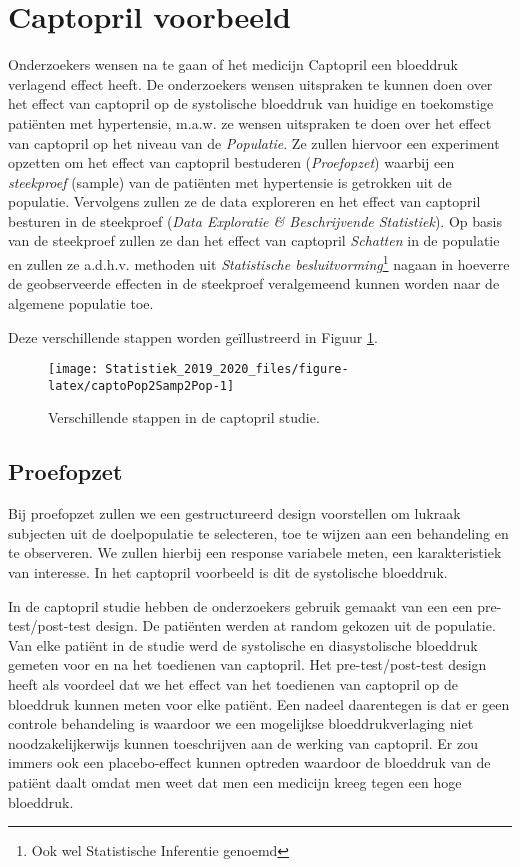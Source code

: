 \documentclass[12pt,dutch,coursenotes]{book}
\let\rmarkdownfootnote\footnote%
\def\footnote{\protect\rmarkdownfootnote}
\theoremstyle{definition}
\theoremstyle{definition}
\theoremstyle{definition}
\theoremstyle{remark}
\begin{document}
\section{Captopril voorbeeld}\label{captopril-voorbeeld}

Onderzoekers wensen na te gaan of het medicijn Captopril een bloeddruk
verlagend effect heeft. De onderzoekers wensen uitspraken te kunnen doen
over het effect van captopril op de systolische bloeddruk van huidige en
toekomstige patiënten met hypertensie, m.a.w. ze wensen uitspraken te
doen over het effect van captopril op het niveau van de
\emph{Populatie}. Ze zullen hiervoor een experiment opzetten om het
effect van captopril bestuderen (\emph{Proefopzet}) waarbij een
\emph{steekproef} (sample) van de patiënten met hypertensie is getrokken
uit de populatie. Vervolgens zullen ze de data exploreren en het effect
van captopril besturen in de steekproef (\emph{Data Exploratie \&
Beschrijvende Statistiek}). Op basis van de steekproef zullen ze dan het
effect van captopril \emph{Schatten} in de populatie en zullen ze
a.d.h.v. methoden uit \emph{Statistische besluitvorming}\footnote{Ook
  wel Statistische Inferentie genoemd} nagaan in hoeverre de
geobserveerde effecten in de steekproef veralgemeend kunnen worden naar
de algemene populatie toe.

Deze verschillende stappen worden geïllustreerd in Figuur
\ref{fig:captoPop2Samp2Pop}.

\begin{figure}

{\centering \texttt{[image: Statistiek\_2019\_2020\_files/figure-latex/captoPop2Samp2Pop-1]} 

}

\caption{Verschillende stappen in de captopril studie.}\label{fig:captoPop2Samp2Pop}
\end{figure}

\subsection{Proefopzet}\label{proefopzet}

Bij proefopzet zullen we een gestructureerd design voorstellen om
lukraak subjecten uit de doelpopulatie te selecteren, toe te wijzen aan
een behandeling en te observeren. We zullen hierbij een response
variabele meten, een karakteristiek van interesse. In het captopril
voorbeeld is dit de systolische bloeddruk.

In de captopril studie hebben de onderzoekers gebruik gemaakt van een
een pre-test/post-test design. De patiënten werden at random gekozen uit
de populatie. Van elke patiënt in de studie werd de systolische en
diasystolische bloeddruk gemeten voor en na het toedienen van captopril.
Het pre-test/post-test design heeft als voordeel dat we het effect van
het toedienen van captopril op de bloeddruk kunnen meten voor elke
patiënt. Een nadeel daarentegen is dat er geen controle behandeling is
waardoor we een mogelijkse bloeddrukverlaging niet noodzakelijkerwijs
kunnen toeschrijven aan de werking van captopril. Er zou immers ook een
placebo-effect kunnen optreden waardoor de bloeddruk van de patiënt
daalt omdat men weet dat men een medicijn kreeg tegen een hoge
bloeddruk.
\end{document}
